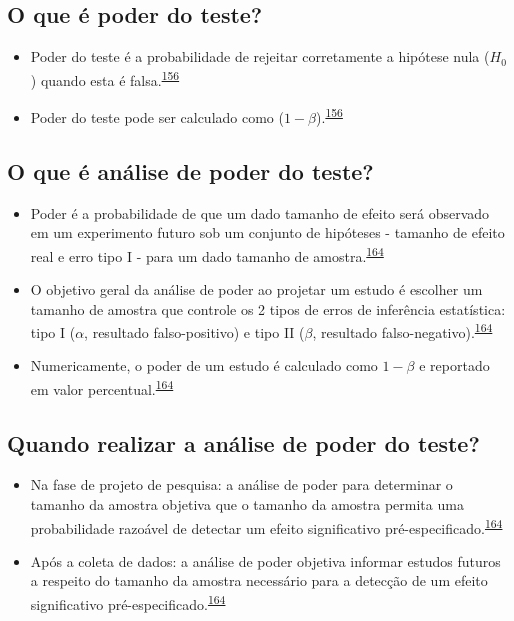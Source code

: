 \documentclass[
  a4paper,
]{book}
\begin{document}
\hypertarget{o-que-uxe9-poder-do-teste}{%
\subsection{O que é poder do teste?}\label{o-que-uxe9-poder-do-teste}}

\begin{itemize}
\item
  Poder do teste é a probabilidade de rejeitar corretamente a hipótese nula (\(H_{0}\)) quando esta é falsa.\textsuperscript{\protect\hyperlink{ref-Curran-Everett2009}{156}}
\item
  Poder do teste pode ser calculado como (\(1 - \beta\)).\textsuperscript{\protect\hyperlink{ref-Curran-Everett2009}{156}}
\end{itemize}

\hypertarget{o-que-uxe9-anuxe1lise-de-poder-do-teste}{%
\subsection{O que é análise de poder do teste?}\label{o-que-uxe9-anuxe1lise-de-poder-do-teste}}

\begin{itemize}
\item
  Poder é a probabilidade de que um dado tamanho de efeito será observado em um experimento futuro sob um conjunto de hipóteses - tamanho de efeito real e erro tipo I - para um dado tamanho de amostra.\textsuperscript{\protect\hyperlink{ref-heckman2022}{164}}
\item
  O objetivo geral da análise de poder ao projetar um estudo é escolher um tamanho de amostra que controle os 2 tipos de erros de inferência estatística: tipo I (\(\alpha\), resultado falso-positivo) e tipo II (\(\beta\), resultado falso-negativo).\textsuperscript{\protect\hyperlink{ref-heckman2022}{164}}
\item
  Numericamente, o poder de um estudo é calculado como \(1-\beta\) e reportado em valor percentual.\textsuperscript{\protect\hyperlink{ref-heckman2022}{164}}
\end{itemize}

\hypertarget{quando-realizar-a-anuxe1lise-de-poder-do-teste}{%
\subsection{Quando realizar a análise de poder do teste?}\label{quando-realizar-a-anuxe1lise-de-poder-do-teste}}

\begin{itemize}
\item
  Na fase de projeto de pesquisa: a análise de poder para determinar o tamanho da amostra objetiva que o tamanho da amostra permita uma probabilidade razoável de detectar um efeito significativo pré-especificado.\textsuperscript{\protect\hyperlink{ref-heckman2022}{164}}
\item
  Após a coleta de dados: a análise de poder objetiva informar estudos futuros a respeito do tamanho da amostra necessário para a detecção de um efeito significativo pré-especificado.\textsuperscript{\protect\hyperlink{ref-heckman2022}{164}}
\end{itemize}
\end{document}
